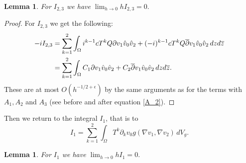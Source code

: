 \documentclass[a4paper, 10pt, twoside, notitlepage]{amsart}
\theoremstyle{plain}
\newtheorem{lem}[prop]{Lemma}
\newcommand{\Om}{\Omega}
\numberwithin{equation}{section}
\newcommand {\p} {\partial}
\newcommand{\e}{\epsilon}
\newcommand{\dbar}{\ol{\p}}
\newcommand{\ol}[1]{\overline{#1}}
\newcommand{\oz}{\overline{z}}
\begin{document}
\begin{lem}\label{lemma_C}
	For $I_{2,3}$ we have $\lim_{h\to 0} hI_{2,3} = 0.$
\end{lem}

\begin{proof}
	For $I_{2,3}$ we get the following: 
	\begin{align*}%
		-iI_{2,3}&=\sum_{k=1}^2\int_{\Om} i^{k-1}cT^kQ\p v_1 \hat{v}_0\hat{v}_2 + (-i)^{k-1}cT^kQ\dbar v_1 \hat{v}_0\hat{v}_2\,dzd\oz\\\notag
		&= \sum_{k=1}^2\int_{\Om} C_1\p v_1 \hat{v}_0\hat{v}_2 + C_2\dbar v_1 \hat{v}_0\hat{v}_2\,dzd\oz.
	\end{align*}
	These are at most $O(h^{-1/2+\e})$ by the same arguments as for the terms with $A_1, A_2$ and $A_3$ (see before and after equation \eqref{A_2}).
\end{proof}

Then we return to the integral $I_1$, that is to
\begin{equation*}
	I_1 = \sum_{k=1}^{2}\int_{\Om}T^k \p_kv_0g(\nabla v_1, \nabla v_2)\,dV_g.
\end{equation*}

\begin{lem}\label{lemma_D}
	For $I_1$ we have $\lim_{h\to 0} hI_1=0.$
\end{lem}
\end{document}
